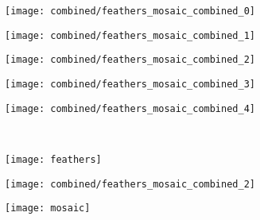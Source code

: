 \begin{figure}
	\centering
	\begin{subfigure}{0.18\textwidth}
		\texttt{[image: combined/feathers\_mosaic\_combined\_0]}
	\end{subfigure}
	\begin{subfigure}{0.18\textwidth}
		\texttt{[image: combined/feathers\_mosaic\_combined\_1]}
	\end{subfigure}
	\begin{subfigure}{0.18\textwidth}
		\texttt{[image: combined/feathers\_mosaic\_combined\_2]}
	\end{subfigure}
	\begin{subfigure}{0.18\textwidth}
		\texttt{[image: combined/feathers\_mosaic\_combined\_3]}
	\end{subfigure}
	\begin{subfigure}{0.18\textwidth}
		\texttt{[image: combined/feathers\_mosaic\_combined\_4]}
	\end{subfigure}\\
	\vspace{0.1cm}
	\begin{subfigure}[t]{0.1\textwidth}
		\vskip 0pt
		\texttt{[image: feathers]}
	\end{subfigure}
	\vspace{0.1cm}
	\begin{subfigure}[t]{0.3\textwidth}
		\vskip 0pt
		\texttt{[image: combined/feathers\_mosaic\_combined\_2]}
	\end{subfigure}
	\begin{subfigure}[t]{0.1\textwidth}
		\vskip 0pt
		\texttt{[image: mosaic]}
	\end{subfigure}\\


\end{figure}
